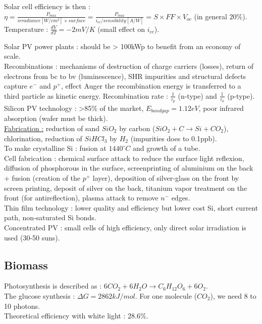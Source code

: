 \documentclass[../main.tex]{subfiles}
\begin{document}
Solar cell efficiency is then : $\eta = \frac{P_{max}}{irradiance [W/cm^2] \times surface} = \frac{P_{max}}{i_{cc}/sensibility[A/W]} = S \times FF \times V_{oc}$ (in general $20\%$).\\
Temperature : $\frac{dV}{dT} = -2mV/K$ (small effect on $i_{cc}$). 

Solar PV power plants : should be > 100kWp to benefit from an economy of scale. \\

Recombinations : mechanisms of destruction of charge carriers (losses), return of electrons from bc to bv (luminescence), SHR impurities and structural defects capture $e^-$ and $p^+$, effect Auger the recombination energy is transferred to a third particle as kinetic energy. Recombination rate : $\frac{1}{\tau_p}$ (n-type) and $\frac{1}{\tau_n}$ (p-type).\\


Silicon PV technology : >85\% of the market, $E_{bandgap} = 1.12eV$, poor infrared absorption (wafer must be thick). \\
\underline{Fabrication :} reduction of sand $SiO_2$ by carbon ($SiO_2 + C \rightarrow Si+CO_2$), chlorination, reduction of $SiHCl_3$ by $H_2$ (impurities does to 0.1ppb). \\
To make crystalline Si : fusion at $1440^\circ C$ and growth of a tube. \\

Cell fabrication : chemical surface attack to reduce the surface light reflexion, diffusion of phosphorous in the surface, screenprinting of aluminium on the back + fusion (creation of the $p^+$ layer), deposition of silver-glass on the front by screen printing, deposit of silver on the back, titanium vapor treatment on the front (for antireflection), plasma attack to remove $n^-$ edges. \\

Thin film technology : lower quality and efficiency but lower cost Si, short current path, non-saturated Si bonds. \\

Concentrated PV : small cells of high efficiency, only direct solar irradiation is used (30-50 suns). 

\subsection{Biomass}
Photosynthesis is described as : $6CO_2 + 6H_2O \rightarrow C_6H_{12} O_6 + 6O_2$.\\
The glucose synthesis : $\Delta G = 2862kJ/mol$. For one molecule ($CO_2$), we need 8 to 10 photons.\\
Theoretical efficiency with white light : $28.6\%$.
\end{document}
